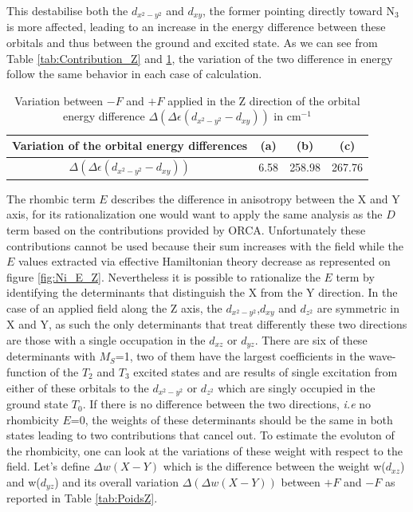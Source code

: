 \documentclass[10pt]{report}
\numberwithin{equation}{section}
\begin{document}
This destabilise both the $d_{x^2-y^2}$ and $d_{xy}$, the former pointing directly toward N$_3$ is more affected, leading to an increase in the energy difference between these orbitals and thus between the ground and excited state.
As we can see from Table \ref{tab:Contribution_Z} and \ref{tab:EOrbitaleZ}, the variation of the two difference in energy follow the same behavior in each case of calculation.

\begin{table}[h]
    \centering
    \begin{tabular}{|c | c c c |}
        \hline
        Variation of the orbital energy differences & (a) & (b) & (c)\\
        \hline
        $\Delta(\Delta \epsilon (d_{x^2-y^2}-d_{xy}))$& 6.58 & 258.98 & 267.76\\
        \hline
    \end{tabular}
    \caption{Variation between $-F$ and $+F$ applied in the Z direction of the orbital energy difference $\Delta(\Delta \epsilon (d_{x^2-y^2}-d_{xy}))$ in cm$^{-1}$}
    \label{tab:EOrbitaleZ}
\end{table}

The rhombic term $E$ describes the difference in anisotropy between the X and Y axis, for its rationalization one would want to apply the same analysis as the $D$ term based on the contributions provided by ORCA.
Unfortunately these contributions cannot be used because their sum increases with the field while the $E$ values extracted via effective Hamiltonian theory decrease as represented on figure \ref{fig:Ni_E_Z}.
Nevertheless it is possible to rationalize the $E$ term by identifying the determinants that distinguish the X from the Y direction. 
In the case of an applied field along the Z axis, the $d_{x^2-y^2}$,$d_{xy}$ and $d_{z^2}$ are symmetric in X and Y, as such the only determinants that treat differently these two directions are those with a single occupation in the $d_{xz}$ or $d_{yz}$.
There are six of these determinants with $M_S$=1, two of them have the largest coefficients in the wave-function of the $T_2$ and $T_3$ excited states and are results of single excitation from either of these orbitals to the $d_{x^2-y^2}$ or $d_{z^2}$ which are singly occupied in the ground state $T_0$.
If there is no difference between the two directions, \textit{i.e} no rhombicity $E$=0, the weights of these determinants should be the same in both states leading to two contributions that cancel out. 
To estimate the evoluton of the rhombicity, one can look at the variations of these weight with respect to the field.
Let's define $\Delta w(X-Y)$ which is the difference between the weight w($d_{xz}$) and w($d_{yz}$) and its overall variation $\Delta (\Delta w(X-Y))$ between $+F$ and $-F$ as reported in Table \ref{tab:PoidsZ}.
\end{document}
